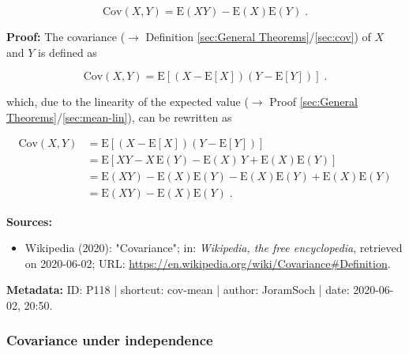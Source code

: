 \documentclass[a4paper,12pt,twoside]{book}
\begin{document}
\begin{equation} \label{eq:cov-mean-cov-mean}
\mathrm{Cov}(X,Y) = \mathrm{E}(X Y) - \mathrm{E}(X) \mathrm{E}(Y) \; .
\end{equation}


\vspace{1em}
\textbf{Proof:} The covariance ($\rightarrow$ Definition \ref{sec:General Theorems}/\ref{sec:cov}) of $X$ and $Y$ is defined as

\begin{equation} \label{eq:cov-mean-cov}
\mathrm{Cov}(X,Y) = \mathrm{E}\left[ (X-\mathrm{E}[X]) (Y-\mathrm{E}[Y]) \right] \; .
\end{equation}

which, due to the linearity of the expected value ($\rightarrow$ Proof \ref{sec:General Theorems}/\ref{sec:mean-lin}), can be rewritten as

\begin{equation} \label{eq:cov-mean-cov-mean-qed}
\begin{split}
\mathrm{Cov}(X,Y) &= \mathrm{E}\left[ (X-\mathrm{E}[X]) (Y-\mathrm{E}[Y]) \right] \\
&= \mathrm{E}\left[ X Y - X \, \mathrm{E}(Y) - \mathrm{E}(X) \, Y + \mathrm{E}(X) \mathrm{E}(Y) \right] \\
&= \mathrm{E}(X Y) - \mathrm{E}(X) \mathrm{E}(Y) - \mathrm{E}(X) \mathrm{E}(Y) + \mathrm{E}(X) \mathrm{E}(Y) \\
&= \mathrm{E}(X Y) - \mathrm{E}(X) \mathrm{E}(Y) \; .
\end{split}
\end{equation}


\vspace{1em}
\textbf{Sources:}
\begin{itemize}
\item Wikipedia (2020): "Covariance"; in: \textit{Wikipedia, the free encyclopedia}, retrieved on 2020-06-02; URL: \url{https://en.wikipedia.org/wiki/Covariance#Definition}.
\end{itemize}


\vspace{1em}
\textbf{Metadata:} ID: P118 | shortcut: cov-mean | author: JoramSoch | date: 2020-06-02, 20:50.
\vspace{1em}



\subsubsection[\textbf{Covariance under independence}]{Covariance under independence} \label{sec:cov-ind}
\setcounter{equation}{0}
\end{document}
